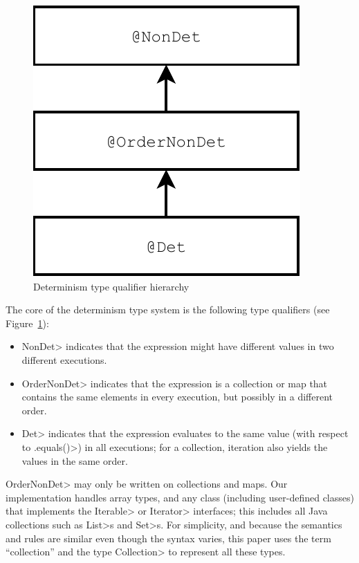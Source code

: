 \begin{figure}
    \begin{center}
        \includegraphics[scale=0.5]{determinism}
    \end{center}
    \caption{Determinism type qualifier hierarchy}
    \label{fig-determinism-hierarchy}
\end{figure}

The core of the determinism type system is the following type qualifiers (see Figure~\ref{fig-determinism-hierarchy}):
\begin{itemize}
    \item \<NonDet> indicates
    that the expression might have different values in two different executions.
    \item \<OrderNonDet> indicates that the expression is a collection or
      map that contains the same elements in every execution, but possibly
      in a different order.
    \item \<Det> indicates that
    the expression evaluates to the same value (with respect to \<.equals()>) in all
    executions; for a collection, iteration also yields the values in the same
    order.
\end{itemize}

\<OrderNonDet> may only be written on collections and maps.  Our implementation
handles array types, and any class (including user-defined classes) that
implements the \<Iterable> or \<Iterator> interfaces; this includes all
Java collections such as \<List>s and \<Set>s.  For simplicity, and because
the semantics and rules are similar even though the syntax varies, this
paper uses the term ``collection'' and the type \<Collection> to represent
all these types.

